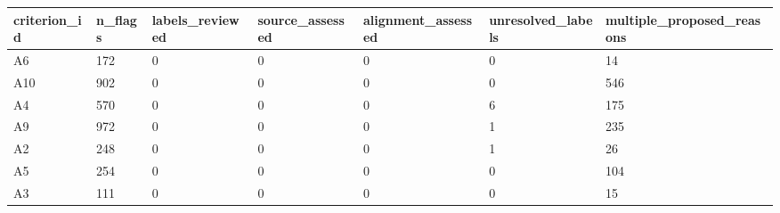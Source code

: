 \begin{tabular}{lllllll}
\hline
criterion\_id & n\_flags & labels\_reviewed & source\_assessed & alignment\_assessed & unresolved\_labels & multiple\_proposed\_reasons \\
\hline
A6 & 172 & 0 & 0 & 0 & 0 & 14 \\
A10 & 902 & 0 & 0 & 0 & 0 & 546 \\
A4 & 570 & 0 & 0 & 0 & 6 & 175 \\
A9 & 972 & 0 & 0 & 0 & 1 & 235 \\
A2 & 248 & 0 & 0 & 0 & 1 & 26 \\
A5 & 254 & 0 & 0 & 0 & 0 & 104 \\
A3 & 111 & 0 & 0 & 0 & 0 & 15 \\
\hline
\end{tabular}